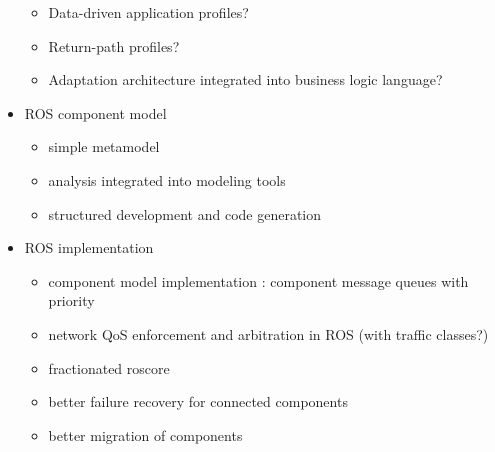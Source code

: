 \begin{itemize}
	\begin{itemize}
		\item Data-driven application profiles?
		\item Return-path profiles?
		\item Adaptation architecture integrated into business logic language?
	\end{itemize}
	\item ROS component model
	\begin{itemize}
		\item simple metamodel
		\item analysis integrated into modeling tools
		\item structured development and code generation
	\end{itemize}
	\item ROS implementation
	\begin{itemize}
		\item component model implementation : component message queues with priority
		\item network QoS enforcement and arbitration in ROS (with traffic classes?)
		\item fractionated roscore
		\item better failure recovery for connected components
		\item better migration of components
	\end{itemize}
\end{itemize}
	